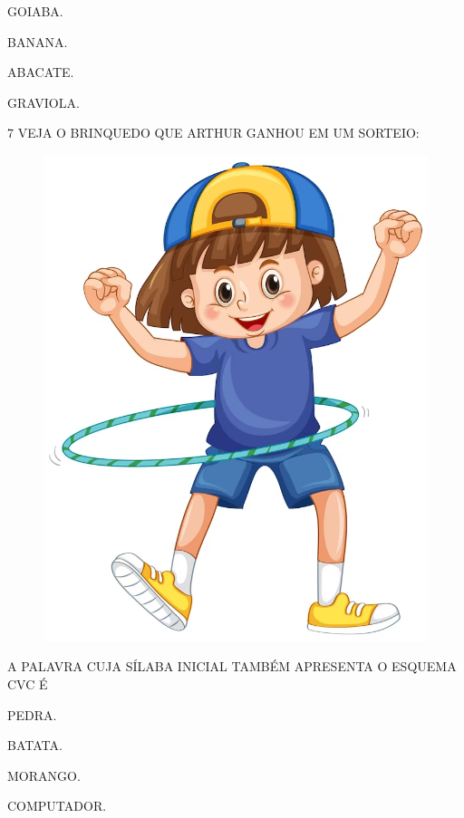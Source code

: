 \begin{escolha}

\item GOIABA.

\item BANANA.

\item ABACATE.

\item GRAVIOLA.

\end{escolha}

\num{7} VEJA O BRINQUEDO QUE ARTHUR GANHOU EM UM SORTEIO:

\begin{figure}[H]
\centering
\includegraphics[width=\textwidth]{./media/image216.png}
\end{figure}

A PALAVRA CUJA SÍLABA INICIAL TAMBÉM APRESENTA O ESQUEMA CVC É

\begin{escolha}

\item PEDRA.

\item BATATA.

\item MORANGO.

\item COMPUTADOR.

\end{escolha}

